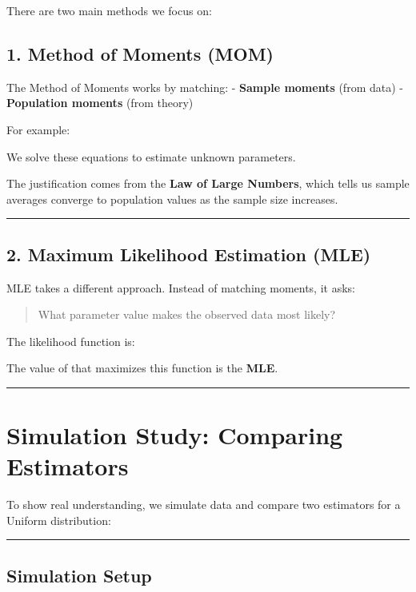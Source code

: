 \documentclass[
  letterpaper,
  DIV=11,
  numbers=noendperiod]{scrartcl}
\begin{document}
There are two main methods we focus on:

\subsection{1. Method of Moments (MOM)}\label{method-of-moments-mom}

The Method of Moments works by matching: - \textbf{Sample moments} (from
data) - \textbf{Population moments} (from theory)

For example:

We solve these equations to estimate unknown parameters.

The justification comes from the \textbf{Law of Large Numbers}, which
tells us sample averages converge to population values as the sample
size increases.

\begin{center}\rule{0.5\linewidth}{0.5pt}\end{center}

\subsection{2. Maximum Likelihood Estimation
(MLE)}\label{maximum-likelihood-estimation-mle}

MLE takes a different approach. Instead of matching moments, it asks:

\begin{quote}
What parameter value makes the observed data most likely?
\end{quote}

The likelihood function is:

The value of that maximizes this function is the \textbf{MLE}.

\begin{center}\rule{0.5\linewidth}{0.5pt}\end{center}

\section{Simulation Study: Comparing
Estimators}\label{simulation-study-comparing-estimators}

To show real understanding, we simulate data and compare two estimators
for a Uniform distribution:

\begin{center}\rule{0.5\linewidth}{0.5pt}\end{center}

\subsection{Simulation Setup}\label{simulation-setup}
\end{document}

